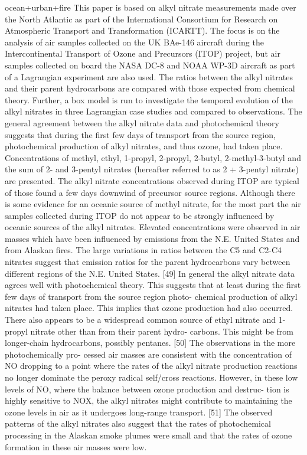 \documentclass[11pt,a4paper]{article}
\begin{document}
\citep{Reeves2007} ocean+urban+fire
This paper is based on alkyl nitrate measurements made over the North Atlantic as part of the International Consortium for Research on Atmospheric Transport and Transformation (ICARTT). The focus is on the analysis of air samples collected on the UK BAe-146 aircraft during the Intercontinental Transport of Ozone and Precursors (ITOP) project, but air samples collected on board the NASA DC-8 and NOAA WP-3D aircraft as part of a Lagrangian experiment are also used. The ratios between the alkyl nitrates and their parent hydrocarbons are compared with those expected from chemical theory. Further, a box model is run to investigate the temporal evolution of the alkyl nitrates in three Lagrangian case studies and compared to observations.
The general agreement between the alkyl nitrate data and photochemical theory suggests that during the first few days of transport from the source region, photochemical production of alkyl nitrates, and thus ozone, had taken place.
Concentrations of methyl, ethyl, 1-propyl, 2-propyl, 2-butyl, 2-methyl-3-butyl and the sum of 2- and 3-pentyl nitrates (hereafter referred to as 2 + 3-pentyl nitrate) are presented.
The alkyl nitrate concentrations observed during
ITOP are typical of those found a few days downwind of precursor source regions. Although there is some evidence for an oceanic source of methyl nitrate, for the most part the air samples collected during ITOP do not appear to be strongly influenced by oceanic sources of the alkyl nitrates. Elevated concentrations were observed in air masses which have been influenced by emissions from the N.E. United States and from Alaskan fires. The large variations in ratios between the C5 and C2-C4 nitrates suggest that emission ratios for the parent hydrocarbons vary between different regions of the N.E. United States. [49] In general the alkyl nitrate data agrees well with photochemical theory. This suggests that at least during the first few days of transport from the source region photo- chemical production of alkyl nitrates had taken place. This implies that ozone production had also occurred. There also appears to be a widespread common source of ethyl nitrate and 1-propyl nitrate other than from their parent hydro- carbons. This might be from longer-chain hydrocarbons, possibly pentanes. [50] The observations in the more photochemically pro- cessed air masses are consistent with the concentration of NO dropping to a point where the rates of the alkyl nitrate production reactions no longer dominate the peroxy radical self/cross reactions. However, in these low levels of NO, where the balance between ozone production and destruc- tion is highly sensitive to NOX, the alkyl nitrates might contribute to maintaining the ozone levels in air as it undergoes long-range transport. [51] The observed patterns of the alkyl nitrates also suggest that the rates of photochemical processing in the Alaskan smoke plumes were small and that the rates of ozone formation in these air masses were low.
\end{document}

